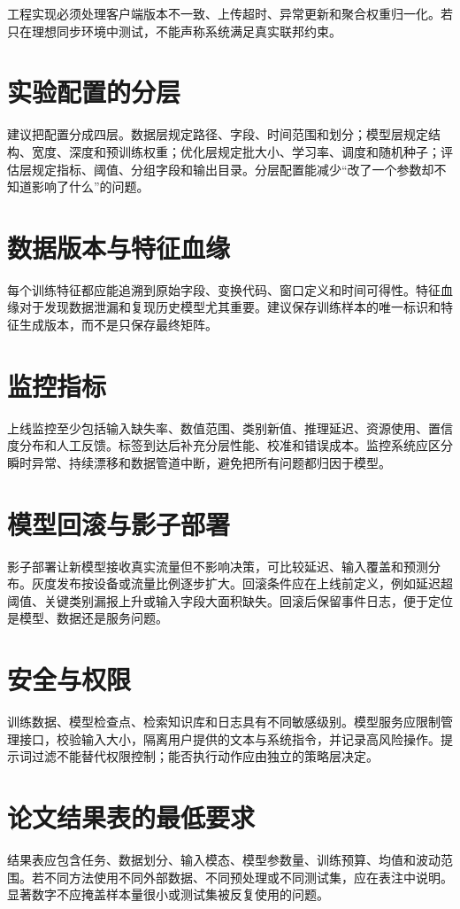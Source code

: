 工程实现必须处理客户端版本不一致、上传超时、异常更新和聚合权重归一化。若只在理想同步环境中测试，不能声称系统满足真实联邦约束。

\section{实验配置的分层}
建议把配置分成四层。数据层规定路径、字段、时间范围和划分；模型层规定结构、宽度、深度和预训练权重；优化层规定批大小、学习率、调度和随机种子；评估层规定指标、阈值、分组字段和输出目录。分层配置能减少“改了一个参数却不知道影响了什么”的问题。

\section{数据版本与特征血缘}
每个训练特征都应能追溯到原始字段、变换代码、窗口定义和时间可得性。特征血缘对于发现数据泄漏和复现历史模型尤其重要。建议保存训练样本的唯一标识和特征生成版本，而不是只保存最终矩阵。

\section{监控指标}
上线监控至少包括输入缺失率、数值范围、类别新值、推理延迟、资源使用、置信度分布和人工反馈。标签到达后补充分层性能、校准和错误成本。监控系统应区分瞬时异常、持续漂移和数据管道中断，避免把所有问题都归因于模型。

\section{模型回滚与影子部署}
影子部署让新模型接收真实流量但不影响决策，可比较延迟、输入覆盖和预测分布。灰度发布按设备或流量比例逐步扩大。回滚条件应在上线前定义，例如延迟超阈值、关键类别漏报上升或输入字段大面积缺失。回滚后保留事件日志，便于定位是模型、数据还是服务问题。

\section{安全与权限}
训练数据、模型检查点、检索知识库和日志具有不同敏感级别。模型服务应限制管理接口，校验输入大小，隔离用户提供的文本与系统指令，并记录高风险操作。提示词过滤不能替代权限控制；能否执行动作应由独立的策略层决定。

\section{论文结果表的最低要求}
结果表应包含任务、数据划分、输入模态、模型参数量、训练预算、均值和波动范围。若不同方法使用不同外部数据、不同预处理或不同测试集，应在表注中说明。显著数字不应掩盖样本量很小或测试集被反复使用的问题。

